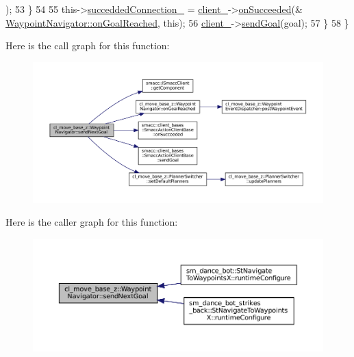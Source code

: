 \begin{DoxyCode}
      );
53     \}
54 
55     this->\hyperlink{classcl__move__base__z_1_1WaypointNavigator_a6e32b1d6cae56963187d0965de251108}{succeddedConnection\_} = \hyperlink{classcl__move__base__z_1_1WaypointNavigator_afc5ad5c5d15f41437286b8fca1d3a324}{client\_}->\hyperlink{classsmacc_1_1client__bases_1_1SmaccActionClientBase_af6d77c27d21b2e4f621f53c5f1df088b}{onSucceeded}(&
      \hyperlink{classcl__move__base__z_1_1WaypointNavigator_ae10ba80b7e46b62096cac96609f66893}{WaypointNavigator::onGoalReached}, \textcolor{keyword}{this});
56     \hyperlink{classcl__move__base__z_1_1WaypointNavigator_afc5ad5c5d15f41437286b8fca1d3a324}{client\_}->\hyperlink{classsmacc_1_1client__bases_1_1SmaccActionClientBase_a9c47a5094ac8afb01680307fe5eca922}{sendGoal}(goal);
57   \}
58 \}
\end{DoxyCode}
Here is the call graph for this function\+:
\nopagebreak
\begin{figure}[H]
\begin{center}
\leavevmode
\includegraphics[width=350pt]{classcl__move__base__z_1_1WaypointNavigator_a1e0a8ff536d2d01a01063fd903029347_cgraph}
\end{center}
\end{figure}
Here is the caller graph for this function\+:
\nopagebreak
\begin{figure}[H]
\begin{center}
\leavevmode
\includegraphics[width=350pt]{classcl__move__base__z_1_1WaypointNavigator_a1e0a8ff536d2d01a01063fd903029347_icgraph}
\end{center}
\end{figure}
\mbox{\label{classcl__move__base__z_1_1WaypointNavigator_a477992dbb2eca9ee77a396d0fe1b084b}} 
